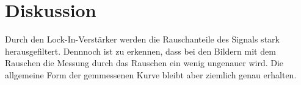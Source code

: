 \newpage
\section{Diskussion}
\label{sec:Diskussion}
Durch den Lock-In-Verstärker werden die Rauschanteile des Signals stark herausgefiltert.
Dennnoch ist zu erkennen, dass bei den Bildern mit dem Rauschen die Messung durch das Rauschen ein wenig ungenauer wird.
Die allgemeine Form der gemmessenen Kurve bleibt aber ziemlich genau erhalten.